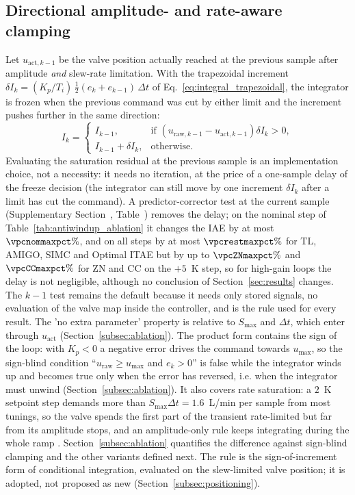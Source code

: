 \subsection{Directional amplitude- and rate-aware clamping}
\label{subsec:clamping_rule}
Let $u_{\text{act},k-1}$ be the valve position actually reached at the previous sample after amplitude \emph{and} slew-rate limitation. With the trapezoidal increment $\delta I_k = (K_p/T_i)\,\tfrac{1}{2}(e_k + e_{k-1})\,\Delta t$ of Eq.~\eqref{eq:integral_trapezoidal}, the integrator is frozen when the previous command was cut by either limit and the increment pushes further in the same direction:
\begin{equation}
    I_k = \begin{cases}
        I_{k-1}, & \text{if } \left(u_{\text{raw},k-1} - u_{\text{act},k-1}\right)\delta I_k > 0, \\
        I_{k-1} + \delta I_k, & \text{otherwise.}
    \end{cases}
    \label{eq:clamping_antiwindup}
\end{equation}
Evaluating the saturation residual at the previous sample is an implementation choice, not a necessity: it needs no iteration, at the price of a one-sample delay of the freeze decision (the integrator can still move by one increment $\delta I_k$ after a limit has cut the command). A predictor-corrector test at the current sample (Supplementary Section~, Table~) removes the delay; on the nominal step of Table~\ref{tab:antiwindup_ablation} it changes the IAE by at most $\vpcnommaxpct\%$, and on all steps by at most $\vpcrestmaxpct\%$ for TL, AMIGO, SIMC and Optimal ITAE but by up to $\vpcZNmaxpct\%$ and $\vpcCCmaxpct\%$ for ZN and CC on the $+5$~K step, so for high-gain loops the delay is not negligible, although no conclusion of Section~\ref{sec:results} changes. The $k-1$ test remains the default because it needs only stored signals, no evaluation of the valve map inside the controller, and is the rule used for every result. The 'no extra parameter' property is relative to $S_{\max}$ and $\Delta t$, which enter through $u_{\text{act}}$ (Section~\ref{subsec:ablation}). The product form contains the sign of the loop: with $K_p < 0$ a negative error drives the command towards $u_{\max}$, so the sign-blind condition ``$u_{\text{raw}} \ge u_{\max}$ and $e_k > 0$'' is false while the integrator winds up and becomes true only when the error has reversed, i.e. when the integrator must unwind (Section~\ref{subsec:ablation}). It also covers rate saturation: a $2$~K setpoint step demands more than $S_{\max}\Delta t = 1.6$~L/min per sample from most tunings, so the valve spends the first part of the transient rate-limited but far from its amplitude stops, and an amplitude-only rule keeps integrating during the whole ramp \cite{bohn1995analysis, peng1996nonlinear}. Section~\ref{subsec:ablation} quantifies the difference against sign-blind clamping and the other variants defined next. The rule is the sign-of-increment form of conditional integration, evaluated on the slew-limited valve position; it is adopted, not proposed as new (Section~\ref{subsec:positioning}).


